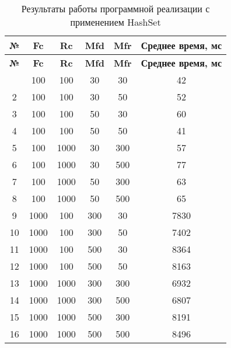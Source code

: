 \begin{longtable}{|c|c|c|c|c|c|}
    \caption{Результаты работы программной реализации с применением HashSet}
    \label{tab:hashset}\\   
    \hline
    \bfseries{№} & \bfseries{Fc} & \bfseries{Rc} & \bfseries{Mfd} & \bfseries{Mfr} & \bfseries{Среднее время, мс} \\
    \endfirsthead
    \bfseries{№} & \bfseries{Fc} & \bfseries{Rc} & \bfseries{Mfd} & \bfseries{Mfr} & \bfseries{Среднее время, мс} \\
    \endhead
    \endfoot
    \hline
    1 & 100 & 100 & 30 & 30 & 42 \\
    \hline
    2 & 100 & 100 & 30 & 50 & 52 \\
    \hline
    3 & 100 & 100 & 50 & 30 & 60 \\
    \hline
    4 & 100 & 100 & 50 & 50 & 41 \\
    \hline
    5 & 100 & 1000 & 30 & 300 & 57 \\
    \hline
    6 & 100 & 1000 & 30 & 500 & 77 \\
    \hline
    7 & 100 & 1000 & 50 & 300 & 63 \\
    \hline
    8 & 100 & 1000 & 50 & 500 & 65 \\
    \hline
    9 & 1000 & 100 & 300 & 30 & 7830 \\
    \hline
    10 & 1000 & 100 & 300 & 50 & 7402 \\
    \hline
    11 & 1000 & 100 & 500 & 30 & 8364 \\
    \hline
    12 & 1000 & 100 & 500 & 50 & 8163 \\
    \hline
    13 & 1000 & 1000 & 300 & 300 & 6932 \\
    \hline
    14 & 1000 & 1000 & 300 & 500 & 6807 \\
    \hline
    15 & 1000 & 1000 & 500 & 300 & 8191 \\
    \hline
    16 & 1000 & 1000 & 500 & 500 & 8496 \\
    \hline
\end{longtable}

